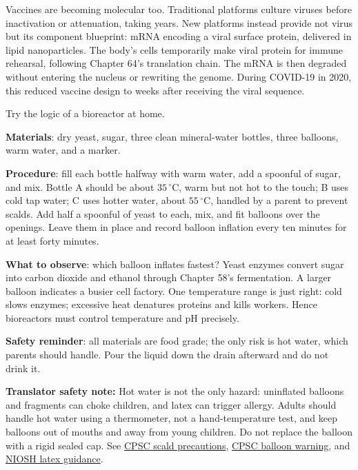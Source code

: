 Vaccines are becoming molecular too. Traditional platforms culture viruses before inactivation or attenuation, taking years. New platforms instead provide not virus but its component blueprint: mRNA encoding a viral surface protein, delivered in lipid nanoparticles. The body's cells temporarily make viral protein for immune rehearsal, following Chapter 64's translation chain. The mRNA is then degraded without entering the nucleus or rewriting the genome. During COVID-19 in 2020, this reduced vaccine design to weeks after receiving the viral sequence.

\begin{shiyan}
Try the logic of a bioreactor at home.

\textbf{Materials}: dry yeast, sugar, three clean mineral-water bottles, three balloons, warm water, and a marker.

\textbf{Procedure}: fill each bottle halfway with warm water, add a spoonful of sugar, and mix. Bottle A should be about $35\,^{\circ}\mathrm{C}$, warm but not hot to the touch; B uses cold tap water; C uses hotter water, about $55\,^{\circ}\mathrm{C}$, handled by a parent to prevent scalds. Add half a spoonful of yeast to each, mix, and fit balloons over the openings. Leave them in place and record balloon inflation every ten minutes for at least forty minutes.

\textbf{What to observe}: which balloon inflates fastest? Yeast enzymes convert sugar into carbon dioxide and ethanol through Chapter 58's fermentation. A larger balloon indicates a busier cell factory. One temperature range is just right: cold slows enzymes; excessive heat denatures proteins and kills workers. Hence bioreactors must control temperature and pH precisely.

\textbf{Safety reminder}: all materials are food grade; the only risk is hot water, which parents should handle. Pour the liquid down the drain afterward and do not drink it.
\end{shiyan}

\textbf{Translator safety note:} Hot water is not the only hazard: uninflated balloons and fragments can choke children, and latex can trigger allergy. Adults should handle hot water using a thermometer, not a hand-temperature test, and keep balloons out of mouths and away from young children. Do not replace the balloon with a rigid sealed cap. See \href{https://www.cpsc.gov/s3fs-public/5098.pdf}{CPSC scald precautions}, \href{https://www.cpsc.gov/s3fs-public/5087.pdf}{CPSC balloon warning}, and \href{https://www.cdc.gov/niosh/docs/2012-119/default.html}{NIOSH latex guidance}.

